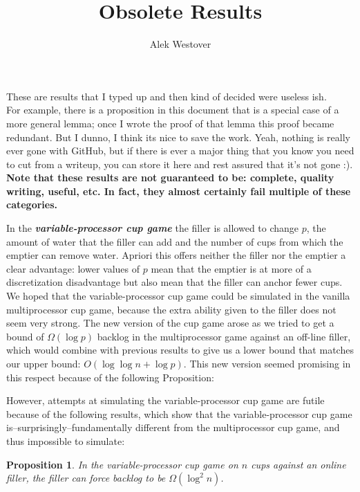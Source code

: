 \documentclass{article}[11pt]
\title{Obsolete Results}
\author{Alek Westover}
\newcommand{\defn}[1]{{\textit{\textbf{\boldmath #1}}}}
\newtheorem{proposition}{Proposition}
\begin{document}
\maketitle

\begin{center}
  {\color{blue}
  \Large
  These are results that I typed up and then kind of decided were useless
  ish.\\ For example, there is a proposition in this document that is a special
  case of a more general lemma; once I wrote the proof of that lemma this proof
  became redundant. But I dunno, I think its nice to save the work. Yeah,
  nothing is really ever gone with GitHub, but if there is ever a major thing
  that you know you need to cut from a writeup, you can store it here and rest
  assured that it's not gone :). \textbf{Note that these results are not
  guaranteed to be: complete, quality writing, useful, etc. In fact, they
almost certainly fail multiple of these categories.}
  }
\end{center}

In the \defn{variable-processor cup game} the filler is allowed to change
$p$, the amount of water that the filler can add and the number of cups from
which the emptier can remove water.  Apriori this offers neither the filler nor the emptier a clear
advantage: lower values of $p$ mean that the emptier is at more of a
discretization disadvantage but also mean that the filler can anchor fewer cups.
We hoped that the variable-processor cup game could be simulated in the vanilla
multiprocessor cup game, because the extra ability given to the filler does not
seem very strong. The new version of the cup game arose as we tried to get a bound 
of $\Omega(\log p)$ backlog in the multiprocessor game against an off-line filler, 
which would combine with previous results to give us a lower bound that matches
our upper bound: $O(\log\log n + \log p)$. This new version seemed promising in
this respect because of the following Proposition:

However, attempts at simulating the variable-processor cup game are futile
because of the following results, which show that the variable-processor cup
game is--surprisingly--fundamentally different from the multiprocessor cup game,
and thus impossible to simulate:

\begin{proposition}
  \label{prop:dpdet}
  In the variable-processor cup game on $n$ cups against an online filler, the
  filler can force backlog to be $\Omega(\log^2 n)$.
\end{proposition}
\end{document}

